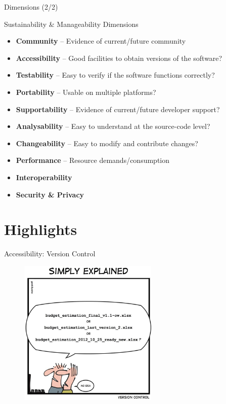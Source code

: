 \documentclass[compress]{beamer}
\begin{document}
\begin{frame}{Dimensions (2/2)}
    \begin{block}{Sustainability \& Manageability Dimensions}
        \begin{itemize}    
            \item \textbf{Community} -- Evidence of current/future community
            \item \textbf{Accessibility} -- Good facilities to obtain versions of the software?
            \item \textbf{Testability} -- Easy to verify if the software functions correctly?
            \item \textbf{Portability} -- Usable on multiple platforms?
            \item \textbf{Supportability} -- Evidence of current/future developer support?
            \item \textbf{Analysability} -- Easy to understand at the source-code level?
            \item \textbf{Changeability} -- Easy to modify and contribute changes? 
            \item \textbf{Performance} -- Resource demands/consumption
            \item \textbf{Interoperability} 
            \item \textbf{Security \& Privacy}
        \end{itemize}
    \end{block}
\end{frame}

\section{Highlights}

\begin{frame}{Accessibility: Version Control}
\begin{figure}
\includegraphics[height=7cm]{img/versioncontrol.jpg}
\end{figure}
\end{frame}
\end{document}
